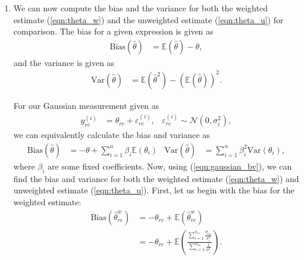 \documentclass[12pt]{article}
\begin{document}
\begin{enumerate}[label=(\alph*)]
    In this expression, we can see that each measurement is weighted by the inverse of its variance $(1/\sigma_i^2)$, which is then normalized by the sum of \textit{all} the inverse-variances such that the sum of the normalized weights equals 1. If we now state that the variances are identical (i.e., $\sigma_i^2=\sigma^2,\ \forall i$), this expression simplifies to the unweighted mean $\hat\theta_{rc}^u$:
    \begin{align}
        \hat\theta_{rc}^u&=\frac{\sum_{i=1}^{n_{rc}}\frac{\theta_{irc}}{\sigma^2}}{\sum_{i=1}^{n_{rc}}\frac{1}{\sigma^2}}\nonumber\\
        &=\frac{\frac{1}{\sigma^2}\sum_{i=1}^{n_{rc}}\theta_{irc}}{\frac{1}{\sigma^2}\sum_{i=1}^{n_{rc}}1}\nonumber\\
        \hat\theta_{rc}^u&=\frac{1}{n_{rc}}\sum_{i=1}^{n_{rc}}\theta_{irc}.\label{eqn:theta_u}
    \end{align}

    \item We can now compute the bias and the variance for both the weighted estimate (\ref{eqn:theta_w}) and the unweighted estimate (\ref{eqn:theta_u}) for comparison. The bias for a given expression is given as
    \begin{align}\label{eqn:bias}
        \text{Bias}(\hat\theta)&=\mathbb E(\hat\theta)-\theta,
    \end{align}
    and the variance is given as
    \begin{align}\label{eqn:variance}
        \text{Var}(\hat\theta)&=\mathbb E(\hat\theta^2)-(\mathbb E(\hat\theta))^2.
    \end{align}

    For our Gaussian measurement given as
    \begin{align}\label{eqn:measurement}
        y_{rc}^{(i)}&=\theta_{rc}+\varepsilon_{rc}^{(i)}, & \varepsilon_{rc}^{(i)}\sim\mathcal N(0,\sigma_i^2),
    \end{align}
    we can equivalently calculate the bias and variance as
    \begin{align}\label{eqn:gaussian_bv}
        \text{Bias}(\hat\theta)&=-\theta+\sum_{i=1}^n\beta_i\mathbb E(\theta_i) & \text{Var}(\hat\theta)&=\sum_{i=1}^n\beta_i^2\text{Var}(\theta_i),
    \end{align}
    where $\beta_i$ are some fixed coefficients. Now, using (\ref{eqn:gaussian_bv}), we can find the bias and variance for both the weighted estimate (\ref{eqn:theta_w}) and unweighted estimate (\ref{eqn:theta_u}). First, let us begin with the bias for the weighted estimate:
    \begin{align*}
        \text{Bias}(\hat\theta_{rc}^w)&=-\theta_{rc}+\mathbb E(\hat\theta_{rc}^w)\\
        &=-\theta_{rc}+\mathbb E\left(\frac{\sum_{i=1}^{n_{rc}}\frac{\theta_{irc}}{\sigma_i^2}}{\sum_{i=1}^{n_{rc}}\frac{1}{\sigma_i^2}}\right).
    \end{align*}


\end{enumerate}
\end{document}
